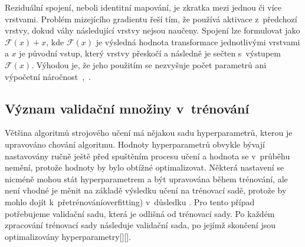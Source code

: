 Reziduální spojení, neboli identitní mapování, je zkratka mezi jednou či více vrstvami. Problém mizejícího gradientu řeší tím, že používá aktivace z~předchozí vrstvy, dokud váhy následující vrstvy nejsou naučeny. Spojení lze formulovat jako $\mathcal{F}(x) + x$, kde $\mathcal{F}(x)$ je výsledná hodnota transformace jednotlivými vrstvami a $x$ je původní vstup, který vrstvy přeskočí a následně je sečten s~výstupem $\mathcal{F}(x)$. Výhodou je, že jeho použitím se nezvyšuje počet parametrů ani výpočetní náročnost~\cite{he2015deep},~\cite{zaeemzadeh2018normpreservation}.



\subsection{Význam validační množiny v~trénování}
Většina algoritmů strojového učení má nějakou sadu hyperparametrů, kterou je upravováno chování algoritmu. Hodnoty hyperparametrů obvykle bývají nastavovány ručně ještě před spuštěním procesu učení a hodnota se v~průběhu nemění, protože hodnoty by bylo obtížné optimalizovat. 
Některá nastavení se nicméně mohou stát hyperparametrem a být upravována během trénování, ale není vhodné je měnit na základě výsledku učení na trénovací sadě, protože by mohlo dojít k~přetrénováníoverfitting) v~důsledku . Pro tento případ potřebujeme validační sadu, která je odlišná od trénovací sady.
Po každém zpracování trénovací sady následuje validační sada, po jejímž skončení jsou optimalizovány hyperparametry[][].







